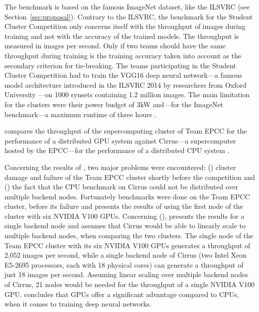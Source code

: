 \documentclass{article}
\begin{document}
The benchmark is based on the famous ImageNet dataset, like
the ILSVRC (see Section~\ref{sec:proposal}).
Contrary to the ILSVRC, the benchmark for the Student
Cluster Competition only concerns itself with the
throughput of images during training and not with the
accuracy of the trained models.
The throughput is measured in images per second.
Only if two teams should have the same throughput during
training is the training accuracy taken into account as
the secondary criterion for tie-breaking.
The teams participating in the Student Cluster Competition
had to train the VGG16 deep neural network---a famous
model architecture introduced in the ILSVRC 2014 by
researchers from Oxford University
\citep{simonyan_et_al_2014}---on 1000 synsets containing
1.2 million images.
The main limitation for the clusters were their power
budget of 3kW and---for the ImageNet benchmark---a maximum
runtime of three hours \citep{nita_2018}.

\citet{nita_2018} compares the throughput of the
supercomputing cluster of Team EPCC for the performance of
a distributed GPU system against Cirrus---a supercomputer
hosted by the EPCC---for the performance of a distributed
CPU system \citep{cirrus}.

Concerning the results of \citet{nita_2018}, two major
problems were encountered: () cluster
damage and failure of the Team EPCC cluster shortly before
the competition and () the fact that the CPU
benchmark on Cirrus could not be distributed over multiple
backend nodes.
Fortunately benchmarks were done on the Team EPCC cluster,
before its failure and \citet{nita_2018} presents the
results of using the first node of the cluster with six
NVIDIA V100 GPUs.
Concerning (), \citet{nita_2018} presents
the results for a single backend node and assumes that
Cirrus would be able to linearly scale to multiple backend
nodes, when comparing the two clusters.
The single node of the Team EPCC cluster with its six
NVIDIA V100 GPUs generates a throughput of 2,052 images per
second, while a single backend node of Cirrus (two Intel
Xeon E5-2695 processors, each with 18 physical cores) can
generate a throughput of just 18 images per second.
Assuming linear scaling over multiple backend nodes of
Cirrus, 21 nodes would be needed for the throughput of a
single NVIDIA V100 GPU.
\citet{nita_2018} concludes that GPUs offer a significant
advantage compared to CPUs, when it comes to training
deep neural networks.
\end{document}
